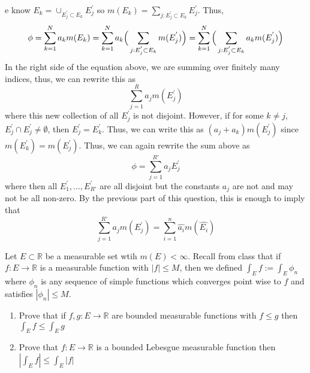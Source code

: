 \documentclass[12pt]{article}
\newcommand{\R}{\mathbb{R}}
\newenvironment{solution}[2][Solution]{\begin{trivlist}
\item[\hskip \labelsep {\bfseries #1}]}{\end{trivlist}}
\newenvironment{problem}[2][Problem]{\begin{trivlist}
\item[\hskip \labelsep {\bfseries #1}\hskip \labelsep {\bfseries #2.}]}{\end{trivlist}}
\begin{document}
\begin{solution}
    We know $E_k = \cup_{E_j^{'}\subset E_k} E_j^{'}$ so $m(E_k) = \sum_{j: E_j^{'}\subset E_k} E_j^{'}$. Thus,
    \[ \phi = \sum_{k=1}^{N} a_km(E_k) = \sum_{k=1}^{N} a_k\Big{(}\sum_{j: E_j^{'}\subset E_k} m(E_j^{'})\Big{)} 
        = \sum_{k=1}^N \Big{(}\sum_{j: E_j^{'}\subset E_k} a_km(E_j^{'})\Big{)}\]
    In the right side of the equation above, we are summing over finitely many indices, thus, we can rewrite this as
    \[ \sum_{j=1}^R a_jm(E_j^{'}) \]
    where this new collection of all $E_j^{'}$ is not disjoint. However, if for some $k\neq j$, $E_j^{'}\cap E_j^{'}\neq\emptyset$,
    then $E_j^{'} = E_k^{'}$. Thus, we can write this as $(a_j + a_k)m(E_j^{'})$ since $m(E_k^{'}) = m(E_j^{'})$. Thus, we can
    again rewrite the sum above as
    \[ \phi = \sum_{j=1}^{R'} a_jE_j^{'} \]
    where then all $E_1^{'},\hdots,E_{R'}^{'}$ are all disjoint but the constants $a_j$ are not and may not be all non-zero.
    By the previous part of this question, this is enough to imply that
    \[ \sum_{j=1}^{R'} a_jm(E_j^{'}) = \sum_{i=1}^n \hat{a_i}m(\hat{E_i}) \]
    
\end{solution}
\pagebreak

\begin{problem}{3}
    Let $E\subset\R$ be a measurable set wtih $m(E)<\infty$. Recall from class that if $f:E\to\R$ is a measurable function
    with $|f|\leq M$, then we defined $\int_E f := \int_E \phi_n$ where $\phi_n$ is any sequence of simple functions which
    converges point wise to $f$ and satisfies $|\phi_n|\leq M$.
    
    \begin{enumerate}
        \item Prove that if $f,g:E\to\R$ are bounded measurable functions with $f\leq g$ then $\int_E f\leq \int_E g$
        \item Prove that $f:E\to\R$ is a bounded Lebesgue measurable function then $|\int_E f|\leq \int_E |f|$
    \end{enumerate}
\end{problem}
\end{document}
